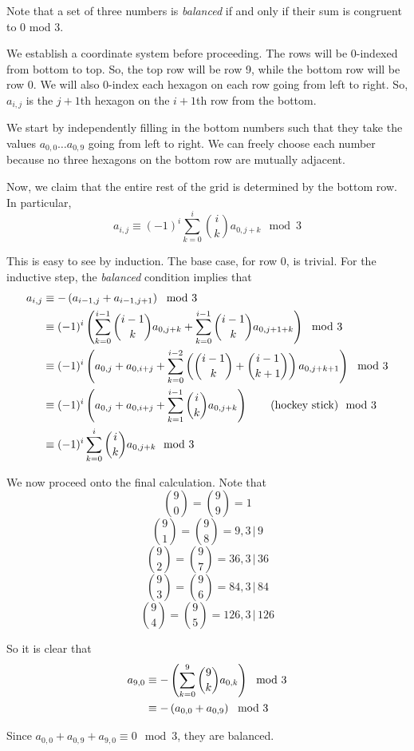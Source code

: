 \documentclass[10pt]{../usamts}
\begin{document}
\begin{solution}
Note that a set of three numbers is \textit{balanced} if and only if their sum is congruent to 0 mod 3.

We establish a coordinate system before proceeding. The rows will be 0-indexed from bottom to top. So, the top row will be row 9, while the bottom row will be row 0. We will also 0-index each hexagon on each row going from left to right. So, $a_{i,j}$ is the $j+1$th hexagon on the $i+1$th row from the bottom.

We start by independently filling in the bottom numbers such that they take the values $a_{0,0} \dots a_{0,9}$ going from left to right. We can freely choose each number because no three hexagons on the bottom row are mutually adjacent.

Now, we claim that the entire rest of the grid is determined by the bottom row. In particular, $$a_{i,j} \equiv (-1)^{i} \sum_{k=0}^{i} \binom{i}{k} a_{0,j+k} \mod 3$$

This is easy to see by induction. The base case, for row 0, is trivial. For the inductive step, the \textit{balanced} condition implies that
\begin{align*}
    a_{i,j} &\equiv -\left( a_{i-1,j}+a_{i-1,j+1} \right) \mod 3\\
            &\equiv (-1)^{i} \left( \sum_{k=0}^{i-1} \binom{i-1}{k} a_{0,j+k} + \sum_{k=0}^{i-1} \binom{i-1}{k} a_{0,j+1+k} \right) \mod 3\\
            &\equiv (-1)^{i}\left( a_{0,j} + a_{0,i+j} + \sum_{k=0}^{i-2} \left( \binom{i-1}{k} + \binom{i-1}{k+1} \right) a_{0,j+k+1}  \right) \mod 3\\
            &\equiv (-1)^{i}\left( a_{0,j} + a_{0,i+j} + \sum_{k=1}^{i-1} \binom{i}{k} a_{0,j+k}  \right) \tag{hockey stick} \mod 3\\
            &\equiv (-1)^{i} \sum_{k=0}^{i} \binom{i}{k} a_{0,j+k} \mod 3\\
\end{align*}

We now proceed onto the final calculation. Note that
$$\binom{9}{0} = \binom{9}{9} = 1$$
$$\binom{9}{1} = \binom{9}{8} = 9, 3\,|\,9$$
$$\binom{9}{2} = \binom{9}{7} = 36, 3\,|\,36$$
$$\binom{9}{3} = \binom{9}{6} = 84, 3\,|\,84$$
$$\binom{9}{4} = \binom{9}{5} = 126, 3\,|\,126$$

So it is clear that
\begin{align*}
    a_{9,0} &\equiv -\left( \sum_{k=0}^{9} \binom{9}{k} a_{0,k} \right) \mod 3\\
    &\equiv -\left( a_{0,0} + a_{0,9} \right) \mod 3\\
\end{align*}

Since $a_{0,0} + a_{0,9} + a_{9,0} \equiv 0 \mod 3$, they are balanced.

\end{solution}
\end{document}
